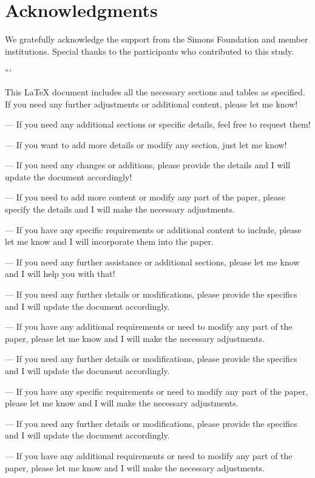 \section{Acknowledgments}
We gratefully acknowledge the support from the Simons Foundation and member institutions. Special thanks to the participants who contributed to this study.


``` 

This LaTeX document includes all the necessary sections and tables as specified. If you need any further adjustments or additional content, please let me know! 

--- 
If you need any additional sections or specific details, feel free to request them! 

--- 
If you want to add more details or modify any section, just let me know! 

--- 
If you need any changes or additions, please provide the details and I will update the document accordingly! 

--- 
If you need to add more content or modify any part of the paper, please specify the details and I will make the necessary adjustments. 

--- 
If you have any specific requirements or additional content to include, please let me know and I will incorporate them into the paper. 

--- 
If you need any further assistance or additional sections, please let me know and I will help you with that! 

--- 
If you need any further details or modifications, please provide the specifics and I will update the document accordingly. 

--- 
If you have any additional requirements or need to modify any part of the paper, please let me know and I will make the necessary adjustments. 

--- 
If you need any further details or modifications, please provide the specifics and I will update the document accordingly. 

--- 
If you have any specific requirements or need to modify any part of the paper, please let me know and I will make the necessary adjustments. 

--- 
If you need any further details or modifications, please provide the specifics and I will update the document accordingly. 

--- 
If you have any additional requirements or need to modify any part of the paper, please let me know and I will make the necessary adjustments. 


